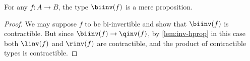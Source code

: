 %
\begin{thm}\label{thm:isprop-biinv}
  For any $f:A\to B$, the type $\biinv(f)$ is a mere proposition.
\end{thm}

\begin{proof}
  We may suppose $f$ to be bi-invertible and show that $\biinv(f)$ is contractible.
  But since $\biinv(f)\to\qinv(f)$, by \cref{lem:inv-hprop} in this case both $\linv(f)$ and $\rinv(f)$ are contractible, and the product of contractible types is contractible.
\end{proof}
